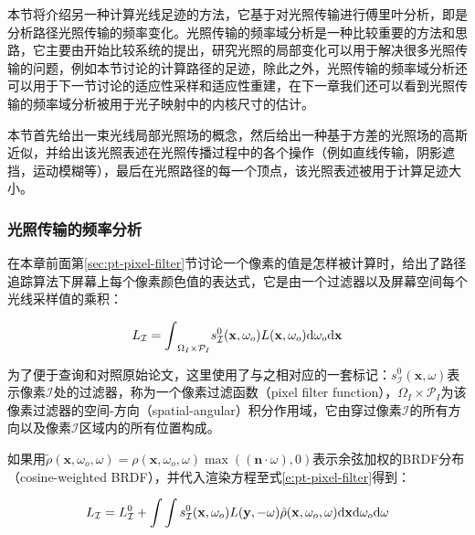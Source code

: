 本节将介绍另一种计算光线足迹的方法，它基于对光照传输进行傅里叶分析，即是分析路径光照传输的频率变化。光照传输的频率域分析是一种比较重要的方法和思路，它主要由\cite{a:AFrequencyAnalysisofLightTransport}开始比较系统的提出，研究光照的局部变化可以用于解决很多光照传输的问题，例如本节讨论的计算路径的足迹，除此之外，光照传输的频率域分析还可以用于下一节讨论的适应性采样和适应性重建，在下一章我们还可以看到光照传输的频率域分析被用于光子映射中的内核尺寸的估计。

本节首先给出一束光线局部光照场的概念，然后给出一种基于方差的光照场的高斯近似，并给出该光照表述在光照传播过程中的各个操作（例如直线传输，阴影遮挡，运动模糊等），最后在光照路径的每一个顶点，该光照表述被用于计算足迹大小。





\subsubsection{光照传输的频率分析}\label{sec:pt-frequency-analysis}
在本章前面第\ref{sec:pt-pixel-filter}节讨论一个像素的值是怎样被计算时，给出了路径追踪算法下屏幕上每个像素颜色值的表达式，它是由一个过滤器以及屏幕空间每个光线采样值的乘积：

\begin{equation}\label{e:pt-pixel-filter}
	L_{\mathcal{I}}={\rm \int}_{\Omega_I\times\mathcal{P}_I}s^{0}_{\mathcal{I}}(\mathbf{x},\omega_{o})L(\mathbf{x},\omega_{o}){\rm d}\omega_{o}{\rm d}\mathbf{x}
\end{equation}

\noindent 为了便于查询和对照原始论文，这里使用了与之相对应的一套标记：$s^{0}_{\mathcal{I}}(\mathbf{x},\omega)$表示像素$\mathcal{I}$处的过滤器，称为一个像素过滤函数（pixel filter function），$\Omega_I\times\mathcal{P}_I$为该像素过滤器的空间-方向（spatial-angular）积分作用域，它由穿过像素$\mathcal{I}$的所有方向以及像素$\mathcal{I}$区域内的所有位置构成。

如果用$\tilde{\rho}(\mathbf{x},\omega_o,\omega)=\rho (\mathbf{x},\omega_o,\omega)\max{((\mathbf{n}\cdot\omega),0)}$表示余弦加权的BRDF分布（cosine-weighted BRDF），并代入渲染方程至式\ref{e:pt-pixel-filter}得到：

\begin{equation}
	L_{\mathcal{I}}=L^{0}_{\mathcal{I}}+{\rm \int}\int s^{0}_{\mathcal{I}}(\mathbf{x},\omega_{o})L(\mathbf{y},-\omega)\tilde{\rho}(\mathbf{x},\omega_o,\omega){\rm d}\mathbf{x}{\rm d}\omega_o {\rm d}\omega
\end{equation}

